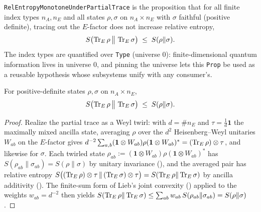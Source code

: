 \begin{definition}\label{RelEntropyMonotoneUnderPartialTrace}
  \leanok
  \texttt{RelEntropyMonotoneUnderPartialTrace} is the proposition that for all finite index types
  \(n_A, n_E\) and all states \(\rho,\sigma\) on \(n_A\times n_E\) with \(\sigma\) faithful
  (positive definite), tracing out the \(E\)-factor does not increase relative entropy,
  \[
    S\bigl(\operatorname{Tr}_E\rho\,\big\|\,\operatorname{Tr}_E\sigma\bigr) \;\le\; S(\rho\|\sigma).
  \]
  The index types are quantified over \texttt{Type} (universe \(0\)): finite-dimensional quantum
  information lives in universe \(0\), and pinning the universe lets this \texttt{Prop} be used as
  a reusable hypothesis whose subsystems unify with any consumer's.
\end{definition}

\begin{theorem}\label{relEntropyMonotone_partialTrace_faithful}
  \leanok
  For positive-definite states \(\rho,\sigma\) on \(n_A\times n_E\),
  \[
    S\bigl(\operatorname{Tr}_E\rho\,\big\|\,\operatorname{Tr}_E\sigma\bigr) \;\le\; S(\rho\|\sigma).
  \]
\end{theorem}
\begin{proof}\leanok
  Realize the partial trace as a Weyl twirl: with \(d = \#n_E\) and \(\tau = \tfrac1d\mathbf 1\)
  the maximally mixed ancilla state, averaging \(\rho\) over the \(d^2\) Heisenberg--Weyl unitaries
  \(W_{ab}\) on the \(E\)-factor gives
  \(d^{-2}\sum_{a,b}(\mathbf 1\otimes W_{ab})\rho(\mathbf 1\otimes W_{ab})^{*}
  = (\operatorname{Tr}_E\rho)\otimes\tau\), and likewise for \(\sigma\). Each twirled state
  \(\rho_{ab} := (\mathbf 1\otimes W_{ab})\rho(\mathbf 1\otimes W_{ab})^{*}\) has
  \(S(\rho_{ab}\|\sigma_{ab}) = S(\rho\|\sigma)\) by unitary invariance
  (), and the averaged pair has relative entropy
  \(S\bigl((\operatorname{Tr}_E\rho)\otimes\tau\,\|\,(\operatorname{Tr}_E\sigma)\otimes\tau\bigr) = S(\operatorname{Tr}_E\rho\|\operatorname{Tr}_E\sigma)\)
  by ancilla additivity (). The finite-sum form of Lieb's joint
  convexity () applied to the weights \(w_{ab} = d^{-2}\) then
  yields \(S(\operatorname{Tr}_E\rho\|\operatorname{Tr}_E\sigma)\le\sum_{ab} w_{ab}\,S(\rho_{ab}\|\sigma_{ab}) = S(\rho\|\sigma)\).
\end{proof}

